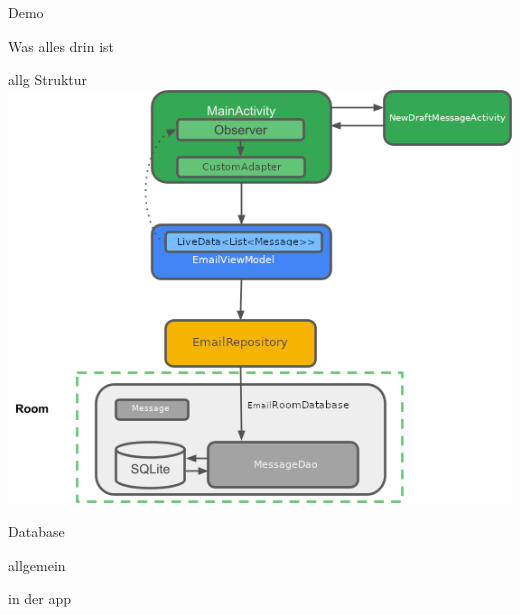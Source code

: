 \documentclass[aspectratio=169]{beamer}
\begin{document}
\begin{frame}{Demo}
\end{frame}

\begin{frame}{Was alles drin ist}
\end{frame}

\begin{frame}{allg Struktur}
\centering
\includegraphics[height=.7\textheight]{../maturText/media/AppStructure.png}
\end{frame}

\begin{frame}{Database}
\begin{block}{allgemein}
\end{block}

\begin{block}{in der app}
\end{block}
\end{frame}
\end{document}
